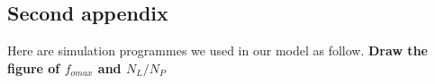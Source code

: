 \documentclass{mcmthesis}
\begin{document}
\begin{appendices}
		\section{Second appendix}
		Here are simulation programmes we used in our model as follow.
		\noindent \textbf{\textcolor[rgb]{0.98,0.00,0.00}{Draw the figure of $f_{omax}$ and $N_L/N_P$}}
%		
%		
%		
%		
%		
%		
%		
%		
%		
%		
%		
	\end{appendices}
\end{document}
